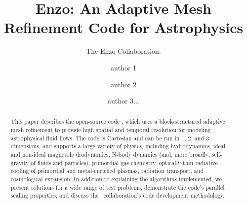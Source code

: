 \documentclass[onecolumn,iop]{emulateapj}  %
\begin{document}
\title{Enzo: An Adaptive Mesh Refinement Code for Astrophysics}
\author{The Enzo Collaboration:}
\author{author 1}
\author{author 2}
\author{author 3...}


\begin{abstract}
This paper describes the open-source code \enzo, which uses a
block-structured adaptive mesh refinement to provide high spatial and
temporal resolution for modeling astrophysical fluid flows.  The code
is Cartesian and can be run in 1, 2, and 3 dimensions, and supports a
large variety of physics, including hydrodynamics, ideal and non-ideal
magnetohydrodynamics, N-body dynamics (and, more broadly, self-gravity
of fluids and particles), primordial gas chemistry, optically-thin
radiative cooling of primordial and metal-enriched plasmas, radiation
transport, and cosmological expansion.  In addition to explaining the
algorithms implemented, we present solutions for a wide range of test
problems, demonstrate the code's parallel scaling properties, and
discuss the \enzo\ collaboration's code development methodology.
\end{abstract}


\maketitle





\end{document}
